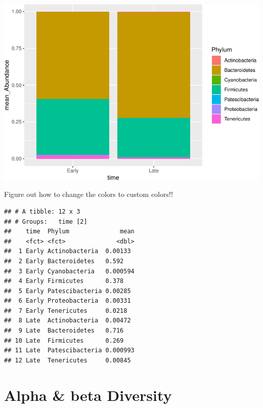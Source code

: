 \documentclass[
]{book}
\newenvironment{Shaded}{\begin{snugshade}}{\end{snugshade}}
\newcommand{\DataTypeTok}[1]{\textcolor[rgb]{0.13,0.29,0.53}{#1}}
\newcommand{\KeywordTok}[1]{\textcolor[rgb]{0.13,0.29,0.53}{\textbf{#1}}}
\newcommand{\NormalTok}[1]{#1}
\newcommand{\OperatorTok}[1]{\textcolor[rgb]{0.81,0.36,0.00}{\textbf{#1}}}
\newcommand{\StringTok}[1]{\textcolor[rgb]{0.31,0.60,0.02}{#1}}
\begin{document}
\includegraphics{16sworkshop_files/figure-latex/unnamed-chunk-2-2.pdf}

Figure out how to change the colors to custom colors!!

\begin{Shaded}
\end{Shaded}

\begin{verbatim}
## # A tibble: 12 x 3
## # Groups:   time [2]
##    time  Phylum              mean
##    <fct> <fct>              <dbl>
##  1 Early Actinobacteria  0.00133 
##  2 Early Bacteroidetes   0.592   
##  3 Early Cyanobacteria   0.000594
##  4 Early Firmicutes      0.378   
##  5 Early Patescibacteria 0.00285 
##  6 Early Proteobacteria  0.00331 
##  7 Early Tenericutes     0.0218  
##  8 Late  Actinobacteria  0.00472 
##  9 Late  Bacteroidetes   0.716   
## 10 Late  Firmicutes      0.269   
## 11 Late  Patescibacteria 0.000993
## 12 Late  Tenericutes     0.00845
\end{verbatim}

\hypertarget{alpha-beta-diversity}{%
\section{Alpha \& beta Diversity}\label{alpha-beta-diversity}}
\end{document}
